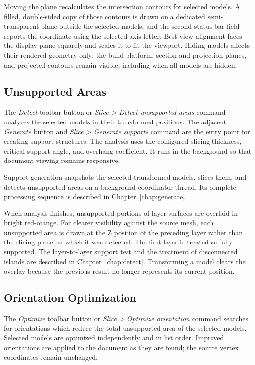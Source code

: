 Moving the plane recalculates the intersection contours for selected models.
A filled, double-sided copy of those contours is drawn on a dedicated
semi-transparent plane outside the selected models, and the second status-bar
field reports the coordinate using the selected axis letter. Best-view
alignment faces the display plane squarely and scales it to fit the viewport.
Hiding models affects their rendered geometry only: the build platform,
section and projection planes, and projected contours remain visible, including
when all models are hidden.

\subsection{Unsupported Areas}

The \emph{Detect} toolbar button or \emph{Slice > Detect unsupported areas}
command analyzes the selected models in their transformed positions. The
adjacent \emph{Generate} button and \emph{Slice > Generate supports} command
are the entry point for creating support structures.
The analysis uses the configured slicing thickness, critical support angle,
and overhang coefficient. It runs in the background so that document viewing
remains responsive.

Support generation snapshots the selected transformed models, slices them,
and detects unsupported areas on a background coordinator thread. Its complete
processing sequence is described in Chapter~\ref{chap:generate}.

When analysis finishes, unsupported portions of layer surfaces are overlaid in
bright red-orange. For clearer visibility against the source mesh, each
unsupported area is drawn at the Z position of the preceding layer rather
than the slicing plane on which it was detected. The first layer is treated
as fully supported. The layer-to-layer support test and the treatment of
disconnected islands are described in Chapter~\ref{chap:detect}. Transforming
a model clears the overlay because the previous result no longer represents
its current position.

\subsection{Orientation Optimization}

The \emph{Optimize} toolbar button or \emph{Slice > Optimize orientation}
command searches for orientations which reduce the total unsupported area of
the selected models. Selected models are optimized independently and in list
order. Improved orientations are applied to the document as they are found;
the source vertex coordinates remain unchanged.

